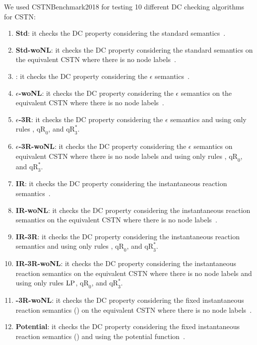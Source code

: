 \documentclass[a4paper,11pt]{article}
\begin{document}
We used CSTNBenchmark2018 for testing  10 different DC checking algorithms for CSTN:
\begin{enumerate}
  \item \textbf{Std}: it checks the DC property considering the standard semantics~\cite{HunsbergerP16Icaps}.
  \item \textbf{Std-woNL}: it checks the DC property considering the standard semantics on the equivalent CSTN where there is no node labels~\cite{CairoEtalTime2017}.
  \item \boldmath{$\epsilon$}: it checks the DC property considering the $\epsilon$ semantics~\cite{HunsbergerP16Icaps}. %
  \item \textbf{$\epsilon$-woNL}: it checks the DC property considering the $\epsilon$ semantics on the equivalent CSTN where there is no node labels~\cite{CairoEtalTime2017}.
  \item \textbf{$\epsilon$-3R}: it checks the DC property considering the $\epsilon$ semantics and using only rules \LP, $\mathup{qR}_0$, and $\mathup{qR}_3^*$.
  \item \textbf{$\epsilon$-3R-woNL}: it checks the DC property considering the $\epsilon$ semantics on equivalent CSTN where there is no node labels and using only rules \LP, $\mathup{qR}_0$, and $\mathup{qR}_3^*$.
  \item \textbf{IR}: it checks the DC property considering the instantaneous reaction semantics~\cite{HunsbergerP16Icaps}.
  \item \textbf{IR-woNL}: it checks the DC property considering the instantaneous reaction semantics on the equivalent CSTN where there is no node labels~\cite{CairoEtalTime2017}.
  \item \textbf{IR-3R}: it checks the DC property considering the instantaneous reaction semantics and using only rules \LP, $\mathup{qR}_0$, and $\mathup{qR}_3^*$.
  \item \textbf{IR-3R-woNL}: it checks the DC property considering the instantaneous reaction semantics on the equivalent CSTN where there is no node labels and using only rules $\text{\textup{LP}}$, $\mathup{qR}_0$, and $\mathup{qR}_3^*$.
  
  \item \textbf{\textpi-3R-woNL}: it checks the DC property considering the fixed instantaneous reaction semantics (\textpi) on the equivalent CSTN where there is no node labels~\cite{HunsbergerPFixed18}.

  \item \textbf{Potential}: it checks the DC property considering the fixed instantaneous reaction semantics (\textpi) and using the potential function~\cite{HunsbergerP20}.
  
\end{enumerate} 
\end{document}
